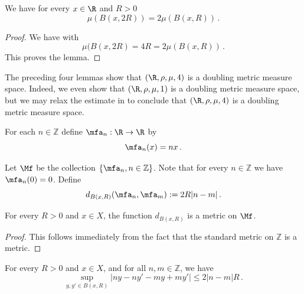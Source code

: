 \begin{lemma}
\label{real-line-doubling}
\leanok
{}
    We have for every $x\in \R$ and $R>0$
    \begin{equation}
        \mu(B(x,2R))=2\mu(B(x,R))\, .
    \end{equation}
\end{lemma}
\begin{proof}
    \leanok
    We have with 
\begin{equation}
    \mu(B(x,2R)=4R=2\mu(B(x,R))\, .
\end{equation}
This proves the lemma.
\end{proof}


The preceding four lemmas show that $(\R, \rho, \mu, 4)$ is a doubling metric measure space. Indeed, we even show
that $(\R, \rho, \mu, 1)$ is a doubling metric measure space, but we may relax the estimate in  to conclude that $(\R, \rho, \mu, 4)$
is a doubling metric measure space.


For each $n\in \mathbb{Z}$ define
$\mfa_n:\R\to \R$ by
\begin{equation}
    \mfa_n(x)=nx\, .
\end{equation}


Let $\Mf$ be the collection $\{\mfa_n, n\in \mathbb{Z}\}$.
Note that for every $n\in \mathbb{Z}$ we have $\mfa_n(0)=0$.
Define
\begin{equation}
    \label{eqcarl4}
    d_{B(x,R)}(\mfa_n, \mfa_m) := 2R|n-m|\,.
\end{equation}

\begin{lemma}
    \label{frequency-metric}
    \leanok
    For every $R > 0$ and $x \in X$, the function $d_{B(x,R)}$ is a metric on $\Mf$.
\end{lemma}

\begin{proof}
    \leanok
    This follows immediately from the fact that the standard metric on $\mathbb{Z}$ is a metric.
\end{proof}

\begin{lemma}
\label{oscillation-control}
\leanok
{}
    For every $R > 0$ and $x \in X$, and for all $n, m \in \mathbb{Z}$, we have
    \begin{equation}\label{eqcarl2}
       \sup_{y,y'\in B(x,R)}|ny-ny'-my+my'|\le 2|n-m|R\, .
    \end{equation}
\end{lemma}

